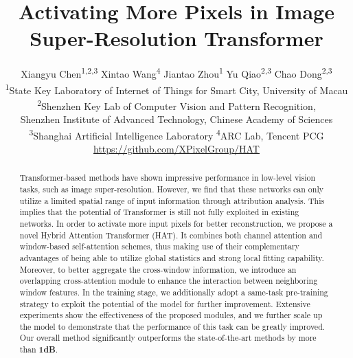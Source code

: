 \documentclass[10pt,twocolumn,letterpaper]{article}
\begin{document}
\title{Activating More Pixels in Image Super-Resolution Transformer}

\author{
 Xiangyu Chen\textsuperscript{\rm 1,2,3} \space \space 
 Xintao Wang\textsuperscript{\rm 4} \space \space 
 Jiantao Zhou\textsuperscript{\rm 1} \space \space 
 Yu Qiao\textsuperscript{\rm 2,3}   \space \space 
 Chao Dong\textsuperscript{\rm 2,3\dag} \\ 
 \textsuperscript{\rm 1}State Key Laboratory of Internet of Things for Smart City, University of Macau\\
 \textsuperscript{\rm 2}Shenzhen Key Lab of Computer Vision and Pattern Recognition, \\Shenzhen Institute of Advanced Technology, Chinese Academy of Sciences\\
 \textsuperscript{\rm 3}Shanghai Artificial Intelligence Laboratory
 \textsuperscript{\rm 4}ARC Lab, Tencent PCG\\ 
\url{https://github.com/XPixelGroup/HAT}
}

\maketitle

\renewcommand{\thefootnote}{}
\renewcommand{\thefootnote}{}

\begin{abstract}
Transformer-based methods have shown impressive performance in low-level vision tasks, such as image super-resolution. However, we find that these networks can only utilize a limited spatial range of input information through attribution analysis. This implies that the potential of Transformer is still not fully exploited in existing networks. In order to activate more input pixels for better reconstruction, we propose a novel Hybrid Attention Transformer (HAT). 
It combines both channel attention and window-based self-attention schemes, thus making use of their complementary advantages of being able to utilize global statistics and strong local fitting capability.
Moreover, to better aggregate the cross-window information, we introduce an overlapping cross-attention module to enhance the interaction between neighboring window features. In the training stage, we additionally adopt a same-task pre-training strategy to exploit the potential of the model for further improvement. Extensive experiments show the effectiveness of the proposed modules, and we further scale up the model to demonstrate that the performance of this task can be greatly improved. Our overall method significantly outperforms the state-of-the-art methods by more than \textbf{1dB}. 
\end{abstract}
\end{document}
